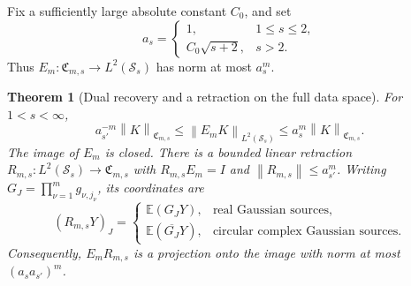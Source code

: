 \documentclass[11pt,a4paper]{amsart}
\numberwithin{equation}{section}
\newtheorem{theorem}{Theorem}[section]
\theoremstyle{definition}
\theoremstyle{remark}
\newcommand{\E}{\mathbb E}
\newcommand{\Sch}{\mathcal S}
\newcommand{\Coeff}{\mathfrak C}
\newcommand{\norm}[1]{\left\lVert#1\right\rVert}
\begin{document}
Fix a sufficiently large absolute constant $C_0$, and set
\begin{equation}\label{eq:as}
 a_s=\begin{cases}1,&1\le s\le2,\\ C_0\sqrt{s+2},&s>2.\end{cases}
\end{equation}
Thus $E_m:\Coeff_{m,s}\to L^2(\Sch_s)$ has norm at most $a_s^m$.

\begin{theorem}[Dual recovery and a retraction on the full data space]\label{thm:coeffrecover}
For $1<s<\infty$,
\begin{equation}\label{eq:dec-equivalence}
 a_{s'}^{-m}\norm K_{\Coeff_{m,s}}
 \le\norm{E_mK}_{L^2(\Sch_s)}
 \le a_s^m\norm K_{\Coeff_{m,s}}.
\end{equation}
The image of $E_m$ is closed. There is a bounded linear retraction
$R_{m,s}:L^2(\Sch_s)\to\Coeff_{m,s}$ with $R_{m,s}E_m=I$ and
$\norm{R_{m,s}}\le a_{s'}^m$. Writing $G_J=\prod_{\nu=1}^mg_{\nu,j_\nu}$, its coordinates are
\begin{equation}\label{eq:rawdecoder}
 (R_{m,s}Y)_J=
 \begin{cases}
 \E(G_JY),&\text{real Gaussian sources},\\
 \E(\overline{G_J}Y),&\text{circular complex Gaussian sources}.
 \end{cases}
\end{equation}
Consequently, $E_mR_{m,s}$ is a projection onto the image with norm at most $(a_sa_{s'})^m$.
\end{theorem}
\end{document}
